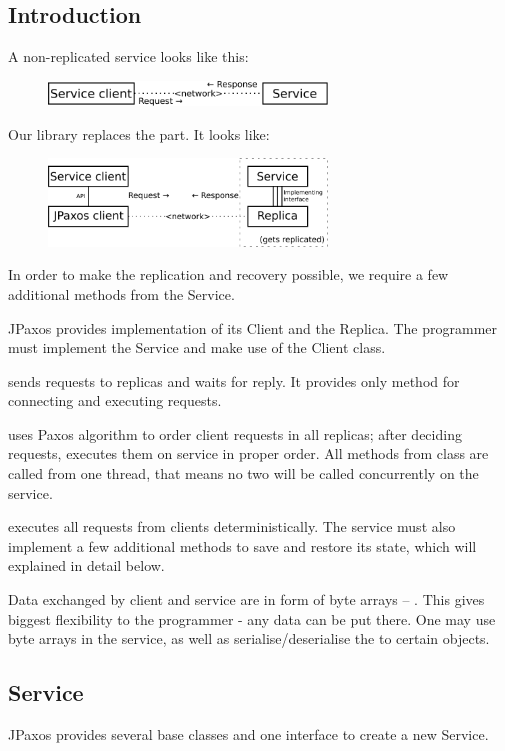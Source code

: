 \subsection{Introduction}
\label{api:introduction}
A non-replicated service looks like this:
\begin{figure}[H]
\centering
\includegraphics[width=20em]{user_guide/api_sm.pdf}
\end{figure}

\noindent\ignorespaces Our library replaces the  part. It looks like:
\begin{figure}[H]
\centering
\includegraphics[width=20em]{user_guide/api_jpaxos.pdf}
\end{figure}

In order to make the replication and recovery possible, we require a few additional methods from the Service.

JPaxos provides implementation of its Client and the Replica. The programmer must implement the Service and make use of the Client class.

 sends requests to replicas and waits for reply. It provides only method for connecting and executing requests.

 uses Paxos algorithm to order client requests in all replicas; after deciding requests, executes them on service in proper order. All methods from  class are called from one  thread, that means no two will be called concurrently on the service.

 executes all requests from clients deterministically. The service must also implement a few additional methods to save and restore its state, which will explained in detail below.

Data exchanged by client and service are in form of byte arrays -- . This gives biggest flexibility to the programmer - any data can be put there. One may use byte arrays in the service, as well as serialise/deserialise the  to certain objects.


\subsection{Service}
\label{api:service}
JPaxos provides several base classes and one interface to create a new Service.

